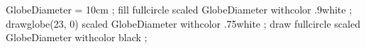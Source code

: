  
\setupsynctex[state=start,method=max] %

\usemodule [luageo]

\startMPpage
    GlobeDiameter = 10cm ;
    fill fullcircle scaled GlobeDiameter withcolor .9white ;  %
    drawglobe(23, 0) scaled GlobeDiameter withcolor .75white ;%
    draw fullcircle scaled GlobeDiameter withcolor black ;    %
\stopMPpage
